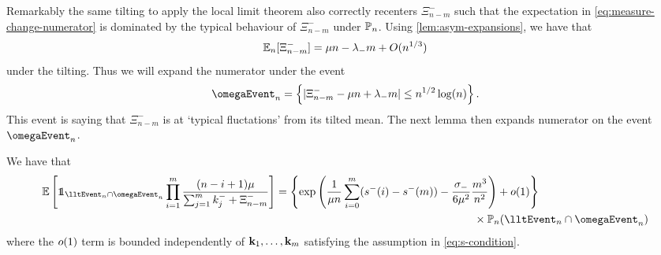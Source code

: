 Remarkably the same tilting to apply the local limit theorem also correctly recenters $\Xi_{n-m}^-$ such that the expectation in \cref{eq:measure-change-numerator} is dominated by the typical behaviour of $\Xi_{n-m}^-$ under $\P_n$. Using \cref{lem:asym-expansions}, we have that
\begin{equation*}
    \E_n[\Xi_{n-m}^-] =  \mu n - \lambda_- m + \bigo(n^{1/3})
\end{equation*}
under the tilting. Thus we will expand the numerator under the event
\begin{equation*}
    \omegaEvent_n = \left\{ 
        \abs{\Xi^-_{n-m} - \mu n + \lambda_- m} \leq n^{1/2} \log(n)
     \right\}.
\end{equation*}
This event is saying that $\Xi_{n-m}^-$ is at `typical fluctations' from its tilted mean. The next lemma then expands numerator on the event $\omegaEvent_n$.
\begin{lemma}
    We have that
    \begin{align*}
        \E\left[ 
            \one_{\lltEvent_n \cap \omegaEvent_n}
            \prod_{i=1}^m \frac{(n - i + 1) \mu}{\sum_{j=1}^m k_j^- + \Xi_{n-m}^-}
        \right]
        & =
        \left\{ \exp\left(
            \frac{1}{\mu n} \sum_{i=0}^m (s^-(i) - s^-(m)) - \frac{\sigma_-}{6 \mu^2} \frac{m^3}{n^2}
        \right) + \littleo(1) \right\} \\
        & \hspace{18em} \times \P_n(\lltEvent_n \cap \omegaEvent_n)
    \end{align*}
    where the $\littleo(1)$ term is bounded independently of $\vk_1, \ldots, \vk_m$ satisfying the assumption in \vref{eq:s-condition}.
\end{lemma}
